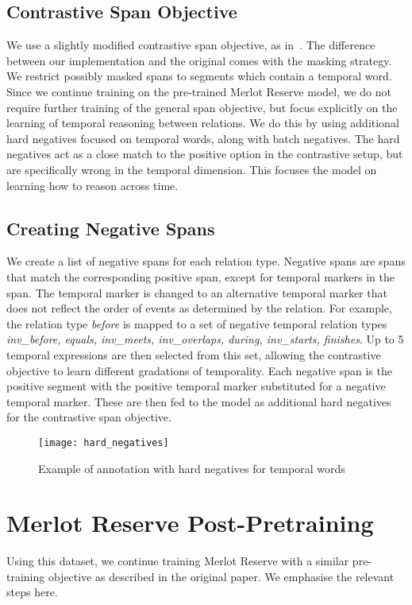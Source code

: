 \subsection{Contrastive Span Objective}
\label{ssec:contr_span}

We use a slightly modified contrastive span objective, as
in~\citet{zellers2022mreserve}. The difference between our implementation and
the original comes with the masking strategy. We restrict possibly masked spans
to segments which contain a temporal word. Since we continue training on the
pre-trained Merlot Reserve model, we do not require further training of the
general span objective, but focus explicitly on the learning of temporal
reasoning between relations. We do this by using additional hard negatives
focused on temporal words, along with batch negatives. The hard negatives act
as a close match to the positive option in the contrastive setup, but are
specifically wrong in the temporal dimension. This focuses the model on
learning how to reason across time.

\subsection{Creating Negative Spans}
\label{ssec:neg_labels}

We create a list of negative spans for each relation type. Negative spans are
spans that match the corresponding positive span, except for temporal markers
in the span. The temporal marker is changed to an alternative temporal marker
that does not reflect the order of events as determined by the relation. For
example, the relation type \textit{before} is mapped to a set of negative
temporal relation types \textit{inv\_before, equals, inv\_meets, inv\_overlaps,
during, inv\_starts, finishes}. Up to 5 temporal expressions are then selected
from this set, allowing the contrastive objective to learn different gradations
of temporality. Each negative span is the positive segment with the positive
temporal marker substituted for a negative temporal marker. These are then fed
to the model as additional hard negatives for the contrastive span objective.

\begin{figure}[tp]
	\centering
	\texttt{[image: hard\_negatives]}
	\caption{Example of annotation with hard negatives for temporal words}
	\label{fig:hard_neg}
\end{figure}


\section{Merlot Reserve Post-Pretraining}
\label{sec:training}

Using this dataset, we continue training Merlot Reserve with a similar
pre-training objective as described in the original paper. We emphasise the
relevant steps here.
